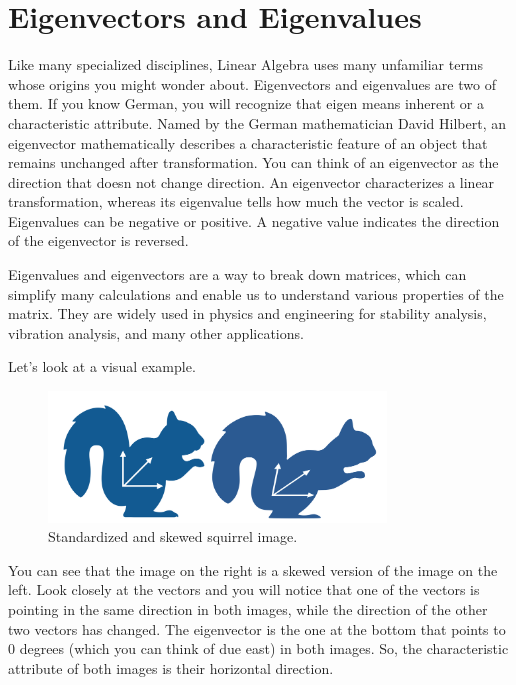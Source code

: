 \chapter{Eigenvectors and Eigenvalues}


Like many specialized disciplines, Linear Algebra uses many unfamiliar terms whose origins you might wonder about. Eigenvectors and eigenvalues are two of them. If you know German, you will recognize that eigen means inherent or a characteristic attribute. Named by the German mathematician David Hilbert, an eigenvector mathematically describes a characteristic feature of an object that remains unchanged after transformation. You can think of an eigenvector as the direction that doesn not change direction. An eigenvector characterizes a linear transformation, whereas its eigenvalue tells how much the vector is scaled. Eigenvalues can be negative or positive. A negative value indicates the direction of the eigenvector is reversed.

Eigenvalues and eigenvectors are a way to break down matrices, which can simplify many calculations and enable us to understand various properties of the matrix. They are widely used in physics and engineering for stability analysis, vibration analysis, and many other applications.  

Let’s look at a visual example.

\begin{figure}[htbp]
    \centering
    \includegraphics[width=0.8\textwidth]{eigensquirrel.png}
    \caption{Standardized and skewed squirrel image.}
    \label{fig:eigensquirrel}
\end{figure}

You can see that the  image on the right is a skewed version of the image on the left. Look closely at the vectors and you will notice that one of the vectors is pointing in the same direction in both images, while the direction of the other two vectors has changed. The eigenvector is the one at the bottom that points to 0 degrees (which you can think of due east) in both images. So, the characteristic attribute of both images is their horizontal direction.

